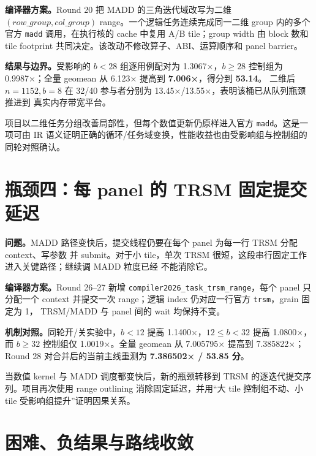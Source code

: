 \documentclass[UTF8,a4paper,openany,11pt,fontset=fandol]{ctexrep}
\begin{document}
\textbf{编译器方案。}Round 20 把 MADD 的三角迭代域改写为二维
\((row\_group,col\_group)\) range。一个逻辑任务连续完成同一二维 group 内的多个官方
\texttt{madd} 调用，在执行核的 cache 中复用 A/B tile；group width 由 block 数和 tile footprint
共同决定。该改动不修改算子、ABI、运算顺序和 panel barrier。

\textbf{结果与边界。}受影响的 \(b<28\) 组逐用例配对为 1.3067×，\(b\ge28\) 控制组为
0.9987×；全量 geomean 从 6.123× 提高到 \textbf{7.006×}，得分到 \textbf{53.14}。
二维后 \(n=1152,b=8\) 在 32/40 参与者分别为 13.45×/13.55×，表明该桶已从队列瓶颈推进到
真实内存带宽平台。

\begin{summarybox}[title=亮点三：在 LLVM Pass 中重排任务域，而不是替换算子]
项目以二维任务分组改善局部性，但每个数值更新仍原样进入官方 \texttt{madd}。这是一项可由
IR 语义证明正确的循环/任务域变换，性能收益也由受影响组与控制组的同轮对照确认。
\end{summarybox}

\section{瓶颈四：每 panel 的 TRSM 固定提交延迟}

\textbf{问题。}MADD 路径变快后，提交线程仍要在每个 panel 为每一行 TRSM 分配 context、写参数
并 submit。对于小 tile，单次 TRSM 很短，这段串行固定工作进入关键路径；继续调 MADD 粒度已经
不能消除它。

\textbf{编译器方案。}Round 26--27 新增 \texttt{compiler2026\_task\_trsm\_range}，每个 panel
只分配一个 context 并提交一次 range；逻辑 index 仍对应一行官方 \texttt{trsm}，grain 固定为 1，
TRSM/MADD 与 panel 间的 wait 均保持不变。

\textbf{机制对照。}同轮开/关实验中，\(b<12\) 提高 1.1400×，\(12\le b<32\) 提高 1.0800×，
而 \(b\ge32\) 控制组仅 1.0019×。全量 geomean 从 7.005795× 提高到 7.385822×；Round 28
对合并后的当前主线重测为 \textbf{7.386502× / 53.85 分}。

\begin{summarybox}[title=亮点四：持续消除编译器生成的串行固定工作]
当数值 kernel 与 MADD 调度都变快后，新的瓶颈转移到 TRSM 的逐迭代提交序列。项目再次使用
range outlining 消除固定延迟，并用“大 tile 控制组不动、小 tile 受影响组提升”证明因果关系。
\end{summarybox}

\section{困难、负结果与路线收敛}
\end{document}
